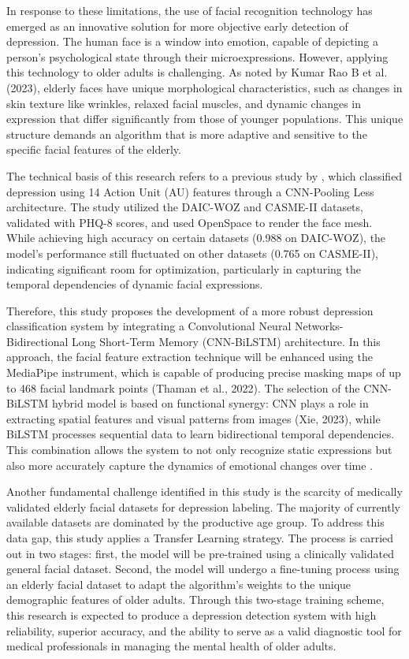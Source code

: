 In response to these limitations, the use of facial recognition technology has emerged as an innovative solution for more objective early detection of depression. The human face is a window into emotion, capable of depicting a person's psychological state through their microexpressions. However, applying this technology to older adults is challenging. As noted by Kumar Rao B et al. (2023), elderly faces have unique morphological characteristics, such as changes in skin texture like wrinkles, relaxed facial muscles, and dynamic changes in expression that differ significantly from those of younger populations. This unique structure demands an algorithm that is more adaptive and sensitive to the specific facial features of the elderly.

The technical basis of this research refers to a previous study by \cite{Sugiyanto2024}, which classified depression using 14 Action Unit (AU) features through a CNN-Pooling Less architecture. The study utilized the DAIC-WOZ and CASME-II datasets, validated with PHQ-8 scores, and used OpenSpace to render the face mesh. While achieving high accuracy on certain datasets (0.988 on DAIC-WOZ), the model's performance still fluctuated on other datasets (0.765 on CASME-II), indicating significant room for optimization, particularly in capturing the temporal dependencies of dynamic facial expressions.

Therefore, this study proposes the development of a more robust depression classification system by integrating a Convolutional Neural Networks-Bidirectional Long Short-Term Memory (CNN-BiLSTM) architecture. In this approach, the facial feature extraction technique will be enhanced using the MediaPipe instrument, which is capable of producing precise masking maps of up to 468 facial landmark points (Thaman et al., 2022). The selection of the CNN-BiLSTM hybrid model is based on functional synergy: CNN plays a role in extracting spatial features and visual patterns from images (Xie, 2023), while BiLSTM processes sequential data to learn bidirectional temporal dependencies. This combination allows the system to not only recognize static expressions but also more accurately capture the dynamics of emotional changes over time \cite{Febrian2022}.

Another fundamental challenge identified in this study is the scarcity of medically validated elderly facial datasets for depression labeling. The majority of currently available datasets are dominated by the productive age group. To address this data gap, this study applies a Transfer Learning strategy. The process is carried out in two stages: first, the model will be pre-trained using a clinically validated general facial dataset. Second, the model will undergo a fine-tuning process using an elderly facial dataset to adapt the algorithm's weights to the unique demographic features of older adults. Through this two-stage training scheme, this research is expected to produce a depression detection system with high reliability, superior accuracy, and the ability to serve as a valid diagnostic tool for medical professionals in managing the mental health of older adults.

